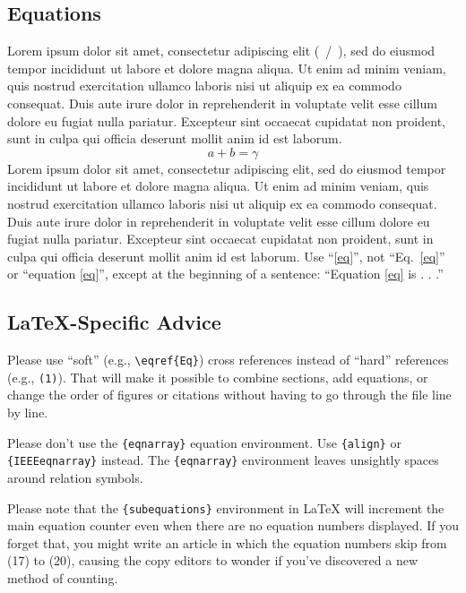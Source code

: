 \documentclass[conference]{IEEEtran}
\begin{document}
\subsection{Equations}
    Lorem ipsum dolor sit amet, consectetur adipiscing elit (~/~), sed do eiusmod 
    tempor incididunt ut labore et dolore magna aliqua. Ut enim ad minim 
    veniam, quis nostrud exercitation ullamco laboris nisi ut aliquip ex ea 
    commodo consequat. Duis aute irure dolor in reprehenderit in voluptate 
    velit esse cillum dolore eu fugiat nulla pariatur. Excepteur sint occaecat 
    cupidatat non proident, sunt in culpa qui officia deserunt mollit anim id 
    est laborum.
\begin{equation}
a+b=\gamma\label{eq}
\end{equation}
    Lorem ipsum dolor sit amet, consectetur adipiscing elit, sed do eiusmod 
    tempor incididunt ut labore et dolore magna aliqua. Ut enim ad minim 
    veniam, quis nostrud exercitation ullamco laboris nisi ut aliquip ex ea 
    commodo consequat. Duis aute irure dolor in reprehenderit in voluptate 
    velit esse cillum dolore eu fugiat nulla pariatur. Excepteur sint occaecat 
    cupidatat non proident, sunt in culpa qui officia deserunt mollit anim id 
    est laborum. Use ``\eqref{eq}'', not ``Eq.~\eqref{eq}'' or ``equation \eqref{eq}'', except at 
    the beginning of a sentence: ``Equation \eqref{eq} is . . .''

\subsection{\LaTeX-Specific Advice}

Please use ``soft'' (e.g., \verb|\eqref{Eq}|) cross references instead
of ``hard'' references (e.g., \verb|(1)|). That will make it possible
to combine sections, add equations, or change the order of figures or
citations without having to go through the file line by line.

Please don't use the \verb|{eqnarray}| equation environment. Use
\verb|{align}| or \verb|{IEEEeqnarray}| instead. The \verb|{eqnarray}|
environment leaves unsightly spaces around relation symbols.

Please note that the \verb|{subequations}| environment in {\LaTeX}
will increment the main equation counter even when there are no
equation numbers displayed. If you forget that, you might write an
article in which the equation numbers skip from (17) to (20), causing
the copy editors to wonder if you've discovered a new method of
counting.
\end{document}
